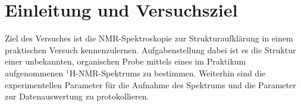 \section{Einleitung und Versuchsziel}
\label{sec:aufgabenstellung}

Ziel des Versuches ist die NMR-Spektroskopie zur Strukturaufklärung in einem praktischen Versuch kennenzulernen. Aufgabenstellung dabei ist es die Struktur einer unbekannten, organischen Probe mittels eines im Praktikum aufgenommenen ${}^1$H-NMR-Spektrums zu bestimmen. Weiterhin sind die experimentellen Parameter für die Aufnahme des Spektrums und die Parameter zur Datenauswertung zu protokollieren.